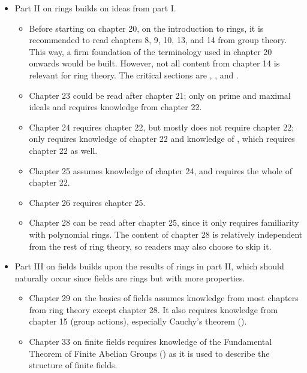 \begin{itemize}
\begin{itemize}
    \end{itemize}
    \item Part II on rings builds on ideas from part I.
    \begin{itemize}
        \item Before starting on chapter 20, on the introduction to rings, it is recommended to read chapters 8, 9, 10, 13, and 14 from group theory. This way, a firm foundation of the terminology used in chapter 20 onwards would be built. However, not all content from chapter 14 is relevant for ring theory. The critical sections are , , and .
        \item Chapter 23 could be read after chapter 21; only  on prime and maximal ideals and  requires knowledge from chapter 22.
        \item Chapter 24 requires chapter 22, but mostly does not require chapter 22; only  requires knowledge of chapter 22 and knowledge of , which requires chapter 22 as well.
        \item Chapter 25 assumes knowledge of chapter 24, and requires the whole of chapter 22.
        \item Chapter 26 requires chapter 25.
        \item Chapter 28 can be read after chapter 25, since it only requires familiarity with polynomial rings. The content of chapter 28 is relatively independent from the rest of ring theory, so readers may also choose to skip it.
    \end{itemize}
    \item Part III on fields builds upon the results of rings in part II, which should naturally occur since fields are rings but with more properties.
    \begin{itemize}
        \item Chapter 29 on the basics of fields assumes knowledge from most chapters from ring theory except chapter 28. It also requires knowledge from chapter 15 (group actions), especially Cauchy's theorem ().
        \item Chapter 33 on finite fields requires knowledge of the Fundamental Theorem of Finite Abelian Groups () as it is used to describe the structure of finite fields.

\end{itemize}
\end{itemize}
